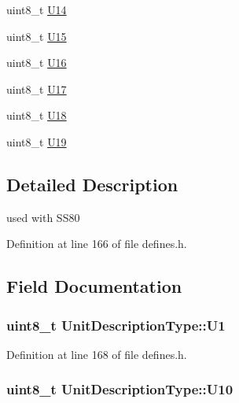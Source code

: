 \begin{DoxyCompactItemize}
uint8\+\_\+t \hyperlink{structUnitDescriptionType_a4a6129e1bed33bf743895f5864208cc0}{U14}
\item 
uint8\+\_\+t \hyperlink{structUnitDescriptionType_a67851c4a906293451b0c3e49fe79329c}{U15}
\item 
uint8\+\_\+t \hyperlink{structUnitDescriptionType_a7ff11ef3bf5d3e485d300dc46bfc06d7}{U16}
\item 
uint8\+\_\+t \hyperlink{structUnitDescriptionType_a21f0e4e804978c6b29699ae3ed0e5060}{U17}
\item 
uint8\+\_\+t \hyperlink{structUnitDescriptionType_a5af9c5dc8c43c0c53b847bb0e25d8c18}{U18}
\item 
uint8\+\_\+t \hyperlink{structUnitDescriptionType_aeb14175b8f3acc759a3a3c0148a38123}{U19}
\end{DoxyCompactItemize}


\subsection{Detailed Description}
used with S\+S80 

Definition at line 166 of file defines.\+h.



\subsection{Field Documentation}
\subsubsection[{\texorpdfstring{U1}{U1}}]{\setlength{\rightskip}{0pt plus 5cm}uint8\+\_\+t Unit\+Description\+Type\+::\+U1}\hypertarget{structUnitDescriptionType_a3752aa69edf4c75a4d7a00cead8074a4}{}\label{structUnitDescriptionType_a3752aa69edf4c75a4d7a00cead8074a4}


Definition at line 168 of file defines.\+h.

\subsubsection[{\texorpdfstring{U10}{U10}}]{\setlength{\rightskip}{0pt plus 5cm}uint8\+\_\+t Unit\+Description\+Type\+::\+U10}\hypertarget{structUnitDescriptionType_a2751eba36a1207fbeed39f8c1b99dd17}{}\label{structUnitDescriptionType_a2751eba36a1207fbeed39f8c1b99dd17}


